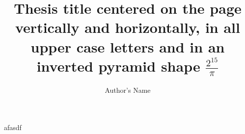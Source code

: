 \documentclass[12pt,oneside]{mines-thesis}
\title{Thesis title centered on the page vertically and horizontally, in all upper case letters and in an inverted pyramid shape $\frac{2^{15}}{\pi}$}         %
\author{Author's Name}  %
\begin{document}
	\maketitlepage
afasdf
\begin{figure} \begin{showtitle} \titleJT \end{showtitle} \end{figure}
\begin{figure} \begin{showtitle} \titleTH \end{showtitle} \end{figure}
\begin{figure} \begin{showtitle} \titleM \end{showtitle} \end{figure}
\begin{figure} \begin{showtitle} \titleS \end{showtitle} \end{figure}
\begin{figure} \begin{showtitle} \titleRF \end{showtitle} \end{figure}
\begin{figure} \begin{showtitle} \titleDB \end{showtitle} \end{figure}
\begin{figure} \begin{showtitle} \titleAM \end{showtitle} \end{figure}
\begin{figure} \begin{showtitle} \titleP \end{showtitle} \end{figure}
\begin{figure} \begin{showtitle} \titleHL \end{showtitle} \end{figure}
\begin{figure} \begin{showtitle} \titleVL \end{showtitle} \end{figure}
\end{document}
